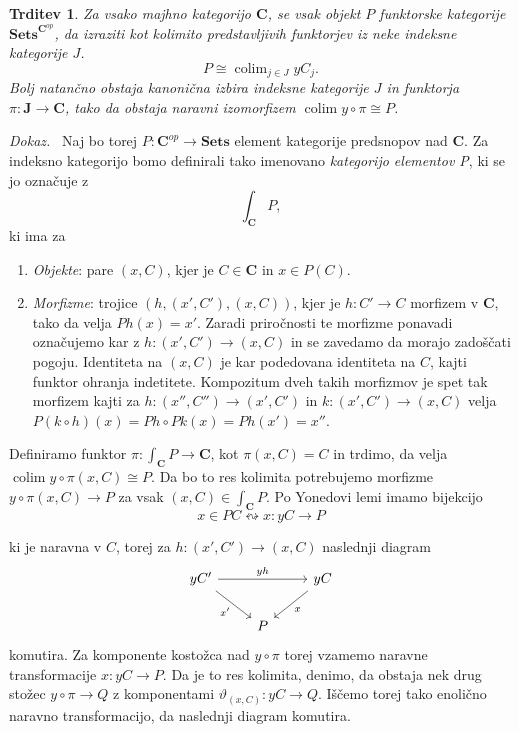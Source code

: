 \documentclass[12pt,a4paper]{book}
\theoremstyle{definition}
\theoremstyle{plain}
\newtheorem{trditev}[definicija]{Trditev}
\newenvironment{dokaz}{\emph{Dokaz.}\ }{\hspace{\fill}{$\Box$}}
\theoremstyle{definition}
\theoremstyle{remark}
\newcommand{\cat}[1]{\textbf{#1}}
\DeclareMathOperator{\colim}{colim}
\newcommand{\predsnop}[1]{\cat{Sets}^{\cat{#1}^{op}}}
\begin{document}
\begin{trditev}
\label{density theorem}
Za vsako majhno kategorijo $\cat{C}$, se vsak objekt $P$ funktorske kategorije $\predsnop{C}$, da izraziti kot kolimito predstavljivih funktorjev iz neke indeksne kategorije $J$.
$$ P \cong \colim_{j \in J} yC_j.$$
Bolj natančno obstaja kanonična izbira indeksne kategorije $J$ in funktorja $\pi : \cat{J} \to \cat{C}$, tako da obstaja naravni izomorfizem $\colim y \circ \pi \cong P$.
\end{trditev}
\begin{dokaz}
Naj bo torej $P : \cat{C}^{op} \to \cat{Sets}$ element kategorije predsnopov nad $\cat{C}$. Za indeksno kategorijo bomo definirali tako imenovano \emph{kategorijo elementov P}, ki se jo označuje z
$$\int_{\cat{C}}P,$$
ki ima za
\begin{enumerate}
\item \emph{Objekte}: pare $(x,C)$, kjer je $C \in \cat{C}$ in $x \in P(C)$.
\item \emph{Morfizme}: trojice $(h, (x',C'), (x,C))$, kjer je $h : C' \to C$ morfizem v $\cat{C}$, tako da velja $Ph(x) = x'$. Zaradi priročnosti te morfizme ponavadi označujemo kar z $h : (x', C') \to (x,C)$ in se zavedamo da morajo zadoščati pogoju.
Identiteta na $(x,C)$ je kar podedovana identiteta na $C$, kajti funktor ohranja indetitete. Kompozitum dveh takih morfizmov je spet tak morfizem kajti za $h : (x'', C'') \to (x', C')$ in $k : (x', C') \to (x,C)$ velja $P(k \circ h)(x) = Ph \circ Pk(x) = Ph(x') = x''$.
\end{enumerate}

Definiramo funktor $\pi : \int_{\cat{C}}P \to \cat{C}$, kot $\pi(x,C) = C$ in trdimo, da velja $\colim y\circ \pi (x,C) \cong P$. Da bo to res kolimita potrebujemo morfizme $y\circ \pi (x,C) \to P$ za vsak $(x,C) \in \int_{\cat{C}}P$. Po Yonedovi lemi imamo bijekcijo
$$x \in PC \leftrightsquigarrow x:yC \to P$$

ki je naravna v $C$, torej za $h: (x',C') \to (x,C)$ naslednji diagram
$$ \begin{tikzcd}
yC' \ar[rr, "yh"] \ar[rd, "x'"'] & & yC \ar[ld, "x"] \\
& P &
\end{tikzcd} $$
komutira. Za komponente kostožca nad $y \circ \pi$ torej vzamemo naravne transformacije $x : yC \to P$. Da je to res kolimita, denimo, da obstaja nek drug stožec $y \circ \pi \to Q$ z komponentami $\vartheta_{(x,C)} : yC \to Q$. Iščemo torej tako enolično naravno transformacijo, da naslednji diagram komutira.


\end{dokaz}
\end{document}
